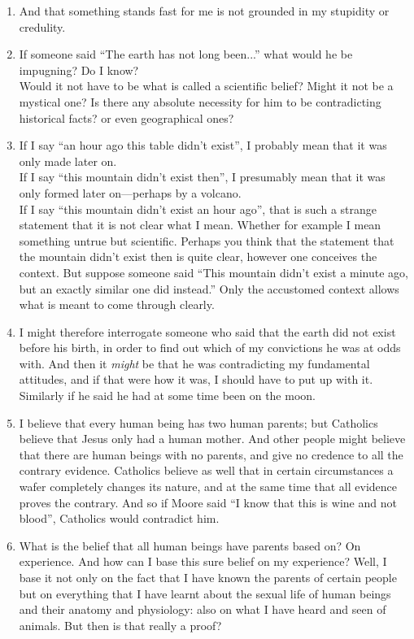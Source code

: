 \documentclass{book}
\begin{document}
\begin{enumerate}
\item
And that something stands fast for me is not grounded in my stupidity or
credulity.

\item
If someone said ``The earth has not long been...'' what would he be impugning?
Do I know? \\
Would it not have to be what is called a scientific belief? Might it not be a
mystical one? Is there any absolute necessity for him to be contradicting
historical facts? or even geographical ones?

\item
If I say ``an hour ago this table didn't exist'', I probably mean that it was
only made later on. \\
If I say ``this mountain didn't exist then'', I presumably mean that it was
only formed later on---perhaps by a volcano. \\
If I say ``this mountain didn't exist an hour ago'', that is such a strange
statement that it is not clear what I mean. Whether for example I mean
something untrue but scientific. Perhaps you think that the statement that the
mountain didn't exist then is quite clear, however one conceives the context.
But suppose someone said ``This mountain didn't exist a minute ago, but an
exactly similar one did instead.'' Only the accustomed context allows what is
meant to come through clearly.

\item
I might therefore interrogate someone who said that the earth did not exist
before his birth, in order to find out which of my convictions he was at odds
with. And then it \emph{might} be that he was contradicting my fundamental
attitudes, and if that were how it was, I should have to put up with it. \\
Similarly if he said he had at some time been on the moon.

\item
I believe that every human being has two human parents; but Catholics believe
that Jesus only had a human mother. And other people might believe that there
are human beings with no parents, and give no credence to all the contrary
evidence. Catholics believe as well that in certain circumstances a wafer
completely changes its nature, and at the same time that all evidence proves
the contrary. And so if Moore said ``I know that this is wine and not blood'',
Catholics would contradict him.

\item
What is the belief that all human beings have parents based on? On experience.
And how can I base this sure belief on my experience? Well, I base it not only
on the fact that I have known the parents of certain people but on everything
that I have learnt about the sexual life of human beings and their anatomy and
physiology: also on what I have heard and seen of animals. But then is that
really a proof?


\end{enumerate}
\end{document}
